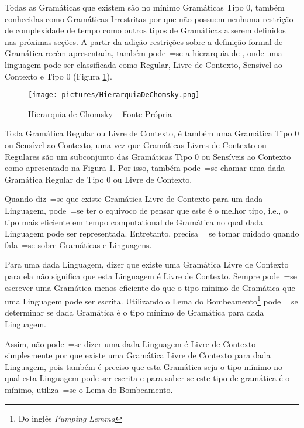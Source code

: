 {    Todas as Gramáticas que existem são no mínimo Gramáticas Tipo 0,
    também conhecidas como Gramáticas Irrestritas por que não possuem nenhuma restrição de complexidade de tempo como outros tipos de Gramáticas a serem definidos nas próximas seções{}.
    A partir da adição restrições sobre a definição formal de Gramática recém apresentada,
    também pode~=se  a hierarquia de ,
    onde uma linguagem pode ser classificada como Regular,
    Livre de Contexto,
    Sensível ao Contexto e
    Tipo 0 (Figura \ref{fig:pictures/HierarquiaDeChomsky.png}).
    \begin{figure}[h]
    \centering
    \texttt{[image: pictures/HierarquiaDeChomsky.png]}
    \caption{Hierarquia de Chomsky -- Fonte Própria }
    \label{fig:pictures/HierarquiaDeChomsky.png}
    \end{figure}

    Toda Gramática Regular ou
    Livre de Contexto,
    é também uma Gramática Tipo 0 ou
    Sensível ao Contexto,
    uma vez que Gramáticas Livres de Contexto ou
    Regulares são um subconjunto das Gramáticas Tipo 0 ou
    Sensíveis ao Contexto como apresentado na Figura \ref{fig:pictures/HierarquiaDeChomsky.png}.
    Por isso,
    também pode~=se chamar uma dada Gramática Regular de Tipo 0 ou
    Livre de Contexto.

    Quando diz~=se que existe Gramática Livre de Contexto para um dada Linguagem,
    pode~=se ter o equívoco de pensar que este é o melhor tipo,
    i.e.,
    o tipo mais eficiente em tempo computational de Gramática no qual dada Linguagem pode ser representada.
    Entretanto,
    precisa~=se tomar cuidado quando fala~=se sobre Gramáticas e
    Linguagens.

    Para uma dada Linguagem,
    dizer que existe uma Gramática Livre de Contexto para ela não significa que esta Linguagem é Livre de Contexto.
    Sempre pode~=se escrever uma Gramática menos eficiente do que o tipo mínimo de Gramática que uma Linguagem pode ser escrita.
    Utilizando o Lema do Bombeamento\footnote{Do inglês \textit{Pumping Lemma}} \cite{hopcroftBook,sipserBook} pode~=se determinar se dada Gramática é o tipo mínimo de Gramática para dada Linguagem.

    Assim,
    não pode~=se dizer uma dada Linguagem é Livre de Contexto simplesmente por que existe uma Gramática Livre de Contexto para dada Linguagem,
    pois também é preciso que esta Gramática seja o tipo mínimo no qual esta Linguagem pode ser escrita e
    para saber se este tipo de gramática é o mínimo,
    utiliza~=se o Lema do Bombeamento.


}
